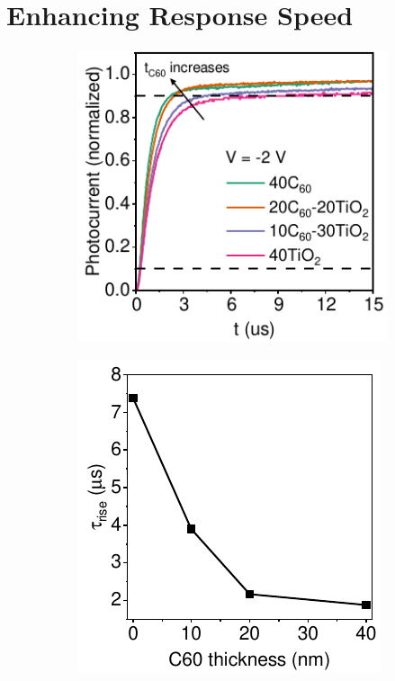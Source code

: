 \section{Enhancing Response Speed}

\begin{figure}[htbp]
    \centering
    \begin{subfigure}[t]{0.4\textwidth}
        \centering
        \includegraphics[width=\textwidth]{chapters/transport_layers/images/TPC_comparison_v2.pdf} %
        \caption{}
        \label{}
    \end{subfigure}
    \hspace{0.5cm}
    \begin{subfigure}[t]{0.37\textwidth}
        \centering
        \includegraphics[width=\textwidth]{chapters/transport_layers/images/Rise_time_f_c60_thickness.pdf} 

\end{subfigure}
\end{figure}
